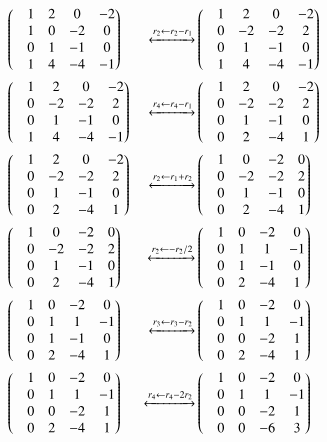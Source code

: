 \documentclass[journal,12pt,twocolumn]{IEEEtran}
\begin{document}
\begin{align}
 & \begin{pmatrix}&1 &2 & 0 &-2 \\ &1 &0 &-2 & 0 \\ &0 &1 &-1 &0 \\&1 &4 &-4 &-1\end{pmatrix} &\xleftrightarrow[]{r_2 \leftarrow r_2 - r_1} &\begin{pmatrix}&1 &2 &0 &-2 \\ &0 &-2 &-2 &2 \\ &0 &1 &-1 &0 \\&1 &4 &-4 &-1\end{pmatrix} \\
 & \begin{pmatrix}&1 &2 &0 &-2 \\ &0 &-2 &-2 &2 \\ &0 &1 &-1 &0 \\&1 &4 &-4 &-1\end{pmatrix} &\xleftrightarrow[]{r_4 \leftarrow r_4 - r_1}&\begin{pmatrix}&1 &2 &0 &-2 \\ &0 &-2 &-2 &2 \\ &0 &1 &-1 &0 \\&0 &2 &-4 &1\end{pmatrix} \\
 & \begin{pmatrix}&1 &2 &0 &-2 \\ &0 &-2 &-2 &2 \\ &0 &1 &-1 &0 \\&0 &2 &-4 &1\end{pmatrix} &\xleftrightarrow[]{r_2 \leftarrow r_1 + r_2} &\begin{pmatrix}&1 &0 &-2 &0 \\ &0 &-2 &-2 &2 \\ &0 &1 &-1 &0 \\&0 &2 &-4 &1\end{pmatrix} \\
 & \begin{pmatrix}&1 &0 &-2 &0 \\ &0 &-2 &-2 &2 \\ &0 &1 &-1 &0 \\&0 &2 &-4 &1\end{pmatrix} &\xleftrightarrow[]{r_2 \leftarrow -r_2/2 } &\begin{pmatrix}&1 &0 &-2 &0 \\ &0 &1 &1 &-1 \\ &0 &1 &-1 &0 \\&0 &2 &-4 &1\end{pmatrix}\\
 & \begin{pmatrix}&1 &0 &-2 &0 \\ &0 &1 &1 &-1 \\ &0 &1 &-1 &0 \\&0 &2 &-4 &1\end{pmatrix}  &\xleftrightarrow[]{r_3 \leftarrow r_3 - r_2} &\begin{pmatrix}&1 &0 &-2 &0 \\ &0 &1 &1 &-1 \\ &0 &0 &-2 &1 \\&0 &2 &-4 &1\end{pmatrix}\\
 &\begin{pmatrix}&1 &0 &-2 &0 \\ &0 &1 &1 &-1 \\ &0 &0 &-2 &1 \\&0 &2 &-4 &1\end{pmatrix} 
 &\xleftrightarrow[]{r_4 \leftarrow r_4 - 2r_2 } &\begin{pmatrix}&1 &0 &-2 &0 \\ &0 &1 &1 &-1 \\ &0 &0 &-2 &1 \\&0 &0 &-6&3\end{pmatrix}
\end{align}
\end{document}
